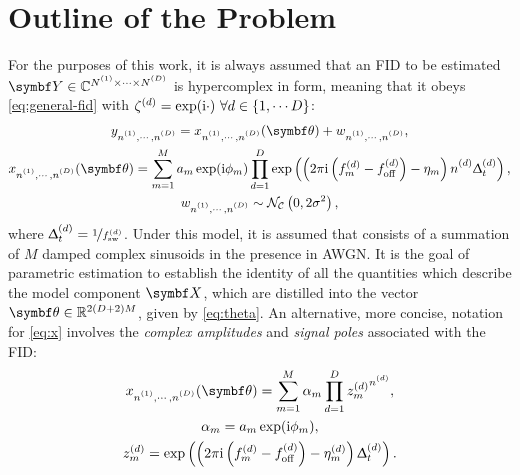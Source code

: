 \section{Outline of the Problem}
\label{sec:theory-outline}
For the purposes of this work, it is always assumed that an \ac{FID} to be
estimated
$\bY \in \mathbb{C}^{\None \times \cdots \times \ND}$
is hypercomplex in form, meaning that it obeys
\eqref{eq:general-fid} with $\zeta^{(d)} = \exp(\mathrm{i} \cdot)\ \forall d \in
\lbrace 1, \cdots D \rbrace$:
\begin{subequations}
    \begin{gather}
        \ynonenD = \xnonenD(\bth) + \wnonenD,\\
        \xnonenD(\bth) =
        \sumM \amexpphim
        \prodD \exp\left(\left(
            2 \pi \iu \left(f^{(d)}_m - \foffd\right)
            -\eta_m\right)
            \nd \Dtd\right),\\
            \label{eq:x}
        \wnonenD \sim \mathcal{N_C}\left(0, 2\sigma^2\right),
    \end{gather}
    \label{eq:hypercomplex-fid}
\end{subequations}%
where $\Updelta_t^{(d)} = \nicefrac{1}{f_{\mathrm{sw}}^{(d)}}$. Under this model, it is assumed that
 consists of a summation of $M$ damped complex sinusoids in the
presence in \ac{AWGN}.
It is the goal of parametric estimation to establish the
identity of all the quantities which describe the model component $\bX$, which
are distilled into the vector $\bth \in \mathbb{R}^{2(D + 2)M}$, given by
\eqref{eq:theta}.
An alternative, more concise, notation for \eqref{eq:x}
involves the \emph{complex amplitudes} and \emph{signal poles} associated with
the \ac{FID}:
\begin{subequations}
    \begin{gather}
        \xnonenD(\bth) = \sumM \alpha_m \prodD {z^{(d)}_m}^{\nd},\\
        \alpha_m = \amexpphim,\\
        z_m^{(d)} = \exp\left(
            \left(2 \pi \iu \left(f_m^{(d)} - \foffd\right) - \eta^{(d)}_m\right) \Dtd
        \right).
    \end{gather}
    \label{eq:x-alpha-z}
\end{subequations}

